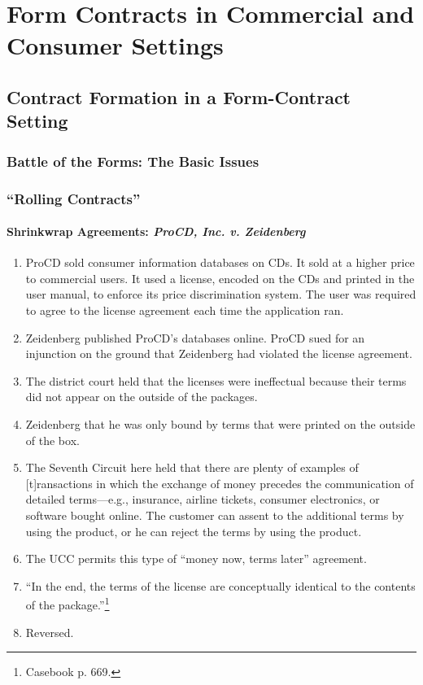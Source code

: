 \section{Form Contracts in Commercial and Consumer Settings}


\subsection{Contract Formation in a Form-Contract Setting}

\subsubsection{Battle of the Forms: The Basic Issues}


\subsubsection{``Rolling Contracts''}

\paragraph{Shrinkwrap Agreements: \emph{ProCD, Inc. v. Zeidenberg}}

\begin{enumerate}
    \item ProCD sold consumer information databases on CDs. It sold at a 
    higher price to commercial users. It used a license, encoded on the CDs 
    and printed in the user manual, to enforce its price discrimination 
    system. The user was required to agree to the license agreement each time 
    the application ran.
    \item Zeidenberg published ProCD's databases online. ProCD sued for an 
    injunction on the ground that Zeidenberg had violated the license 
    agreement.
    \item The district court held that the licenses were ineffectual because 
    their terms did not appear on the outside of the packages.
    \item Zeidenberg that he was only bound by terms that were printed on the 
    outside of the box.
    \item The Seventh Circuit here held that there are plenty of examples of 
    [t]ransactions in which the exchange of money precedes the communication 
    of detailed terms---e.g., insurance, airline tickets, consumer 
    electronics, or software bought online. The customer can assent to the 
    additional terms by using the product, or he can reject the terms by using 
    the product.
    \item The UCC permits this type of ``money now, terms later'' agreement.
    \item ``In the end, the terms of the license are conceptually identical to 
    the contents of the package.''\footnote{Casebook p. 669.}
    \item Reversed.
\end{enumerate}

